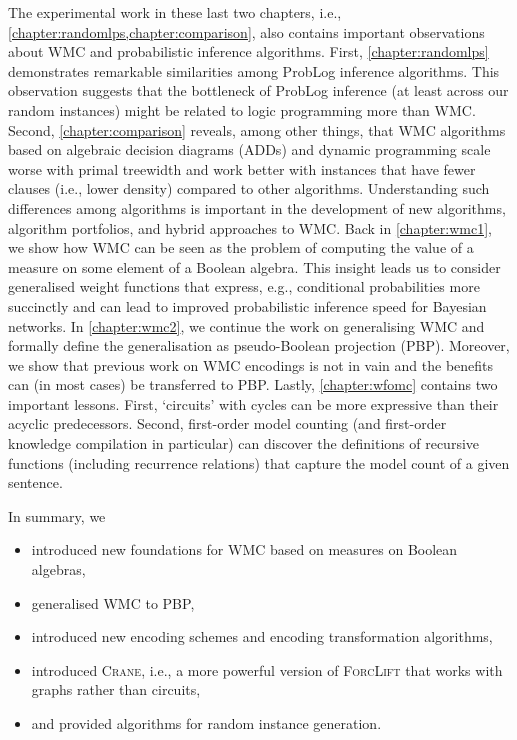 The experimental work in these last two chapters, i.e.,
\cref{chapter:randomlps,chapter:comparison}, also contains important
observations about WMC and probabilistic inference algorithms. First,
\cref{chapter:randomlps} demonstrates remarkable similarities among ProbLog
inference algorithms. This observation suggests that the bottleneck of ProbLog
inference (at least across our random instances) might be related to logic
programming more than WMC\@. Second, \cref{chapter:comparison} reveals, among
other things, that WMC algorithms based on algebraic decision diagrams (ADDs)
and dynamic programming scale worse with primal treewidth and work better with
instances that have fewer clauses (i.e., lower density) compared to other
algorithms. Understanding such differences among algorithms is important in the
development of new algorithms, algorithm portfolios, and hybrid approaches to
WMC\@. Back in \cref{chapter:wmc1}, we show how WMC can be seen as the problem of
computing the value of a measure on some element of a Boolean algebra. This
insight leads us to consider generalised weight functions that express, e.g.,
conditional probabilities more succinctly and can lead to improved probabilistic
inference speed for Bayesian networks. In \cref{chapter:wmc2}, we continue the
work on generalising WMC and formally define the generalisation as
pseudo-Boolean projection (PBP). Moreover, we show that previous work on WMC
encodings is not in vain and the benefits can (in most cases) be transferred to
PBP. Lastly, \cref{chapter:wfomc} contains two important lessons. First,
`circuits' with cycles can be more expressive than their acyclic predecessors.
Second, first-order model counting (and first-order knowledge compilation in
particular) can discover the definitions of recursive functions (including
recurrence relations) that capture the model count of a given sentence.

In summary, we
\begin{itemize}
  \item introduced new foundations for WMC based on measures on Boolean
        algebras,
  \item generalised WMC to PBP,
  \item introduced new encoding schemes and encoding transformation algorithms,
  \item introduced \textsc{Crane}, i.e., a more powerful version of
        \textsc{ForcLift} that works with graphs rather than circuits,
  \item and provided algorithms for random instance generation.
\end{itemize}

